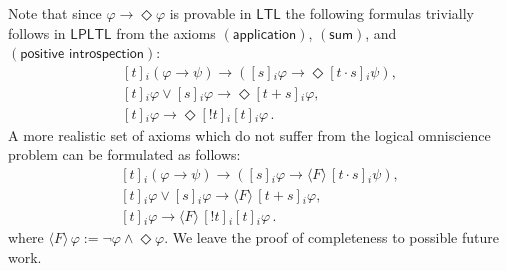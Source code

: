 \documentclass[envcountsect,envcountsame,oribibl,orivec]{llncs}
\newcommand{\limplies}{\rightarrow}
\newcommand{\leventually}{\Diamond}
\newcommand{\LTL}{\textsf{LTL}}
\newcommand{\LPLTL}{\textsf{LPLTL}}
\newcommand{\jbox}[1]{\left[#1\right]\!}
\newcommand{\tapp}{\cdot}
\newcommand{\tinspect}{!}
\newcommand{\appax}{\ensuremath{(\textsf{application})}}
\newcommand{\sumax}{\ensuremath{(\textsf{sum})}}
\newcommand{\posintax}{\ensuremath{(\textsf{positive introspection})}}
\newcommand{\agent}{i}
\renewcommand{\phi}{\varphi}
\begin{document}
\begin{remark}
	Note that since $\phi \limplies \leventually \phi$ is provable in $\LTL$ the following formulas trivially follows  in $\LPLTL$ from the axioms $\appax$, $\sumax$, and \linebreak $\posintax$:
	\begin{gather*}
	\jbox{t}_\agent (\phi \limplies \psi) \limplies (\jbox{s}_\agent \phi \limplies \leventually \jbox{t \tapp s}_\agent \psi), \\
	\jbox{t}_\agent \phi \vee \jbox{s}_\agent \phi \limplies  \leventually \jbox{t + s}_\agent \phi, \\
	\jbox{t}_\agent \phi \limplies \leventually \jbox{\tinspect t}_\agent \jbox{t}_\agent \phi\,.
	\end{gather*} 
	 A more realistic set of axioms which do not suffer from the logical omniscience problem can be formulated as follows:
	\begin{gather*}
	\jbox{t}_\agent (\phi \limplies \psi) \limplies (\jbox{s}_\agent \phi \limplies \langle F \rangle\, \jbox{t \tapp s}_\agent \psi), \\
	\jbox{t}_\agent \phi \vee \jbox{s}_\agent \phi \limplies  \langle F \rangle\, \jbox{t + s}_\agent \phi, \\
	\jbox{t}_\agent \phi \limplies \langle F \rangle\, \jbox{\tinspect t}_\agent \jbox{t}_\agent \phi\,.
	\end{gather*} 
	where $\langle F \rangle\, \phi := \neg \phi \wedge \leventually \phi$. We leave the proof of completeness to possible future work.
\end{remark}



\end{document}
